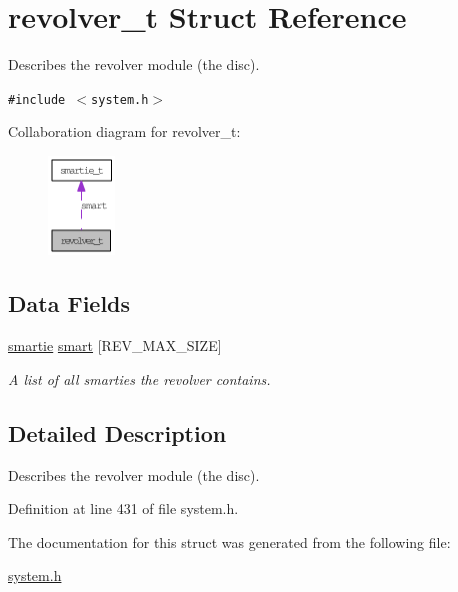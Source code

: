 \hypertarget{structrevolver__t}{
\section{revolver\_\-t Struct Reference}
\label{structrevolver__t}
}
Describes the revolver module (the disc).  


{\tt \#include $<$system.h$>$}

Collaboration diagram for revolver\_\-t:\nopagebreak
\begin{figure}[H]
\begin{center}
\leavevmode
\includegraphics[width=50pt]{structrevolver__t__coll__graph}
\end{center}
\end{figure}
\subsection*{Data Fields}
\begin{CompactItemize}
\item 
\hypertarget{structrevolver__t_cb200f90913d439f988b778ce7a8f2ea}{
\hyperlink{structsmartie__t}{smartie} \hyperlink{structrevolver__t_cb200f90913d439f988b778ce7a8f2ea}{smart} \mbox{[}REV\_\-MAX\_\-SIZE\mbox{]}}
\label{structrevolver__t_cb200f90913d439f988b778ce7a8f2ea}

\begin{CompactList}\small\item\em A list of all smarties the revolver contains. \item\end{CompactList}\end{CompactItemize}


\subsection{Detailed Description}
Describes the revolver module (the disc). 

Definition at line 431 of file system.h.

The documentation for this struct was generated from the following file:\begin{CompactItemize}
\item 
\hyperlink{system_8h}{system.h}\end{CompactItemize}
